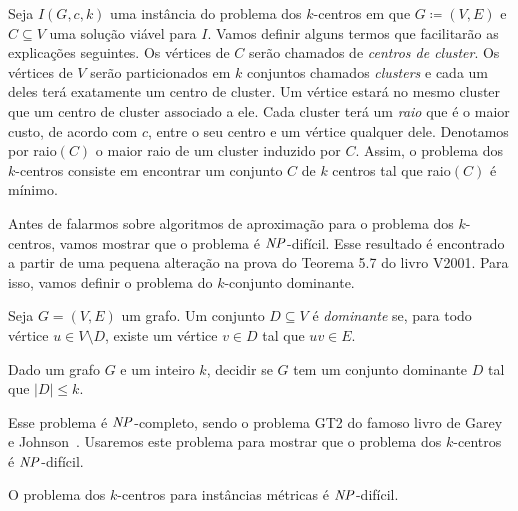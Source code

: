 Seja $I(G,c,k)$ uma instância do problema dos $k$-centros em que $G\coloneqq (V,E)$ e $C \subseteq V$ uma solução viável para $I$. Vamos definir alguns termos que facilitarão as explicações seguintes. Os vértices de $C$ serão chamados de \emph{centros de cluster}. Os vértices de $V$ serão particionados em $k$ conjuntos chamados \emph{clusters} e cada um deles terá exatamente um centro de cluster. Um vértice estará no mesmo cluster que um centro de cluster associado a ele. Cada cluster terá um \emph{raio} que é o maior custo, de acordo com $c$, entre o seu centro e um vértice qualquer dele. Denotamos por raio$(C)$ o maior raio de um cluster induzido por $C$. Assim, o problema dos $k$-centros consiste em encontrar um conjunto $C$ de $k$ centros tal que raio$(C)$ é mínimo.

Antes de falarmos sobre algoritmos de aproximação para o problema dos $k$-centros, vamos mostrar que o problema é $\mathit{NP}$-difícil. Esse resultado é encontrado a partir de uma pequena alteração na prova do Teorema 5.7 do livro V2001. Para isso, vamos definir o problema do $k$-conjunto dominante.

\begin{definition}
    Seja $G = (V,E)$ um grafo. Um conjunto $D \subseteq V$ é \emph{dominante} se, para todo vértice $u \in V \setminus D$, existe um vértice $v \in D$ tal que $uv \in E$.
\end{definition}

\begin{problem}
    Dado um grafo $G$ e um inteiro $k$, decidir se $G$ tem um conjunto dominante $D$ tal que $|D| \leq k$.      
\end{problem}
Esse problema é $\mathit{NP}$-completo, sendo o problema GT2 do famoso livro de Garey e Johnson~\cite{garey1979computers}. Usaremos este problema para mostrar que o problema dos $k$-centros é $\mathit{NP}$-difícil.

\begin{theorem}\label{theorem:2.3}
    O problema dos $k$-centros para instâncias métricas é $\mathit{NP}$-difícil.
\end{theorem}

